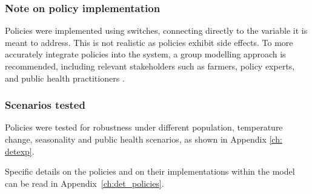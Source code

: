 \subsubsection*{Note on policy implementation}
Policies were implemented using switches, connecting directly to the variable it is meant to address. This is not realistic as policies exhibit side effects. To more accurately integrate policies into the system,  a group modelling approach is recommended, including relevant stakeholders such as farmers, policy experts, and public health practitioners \parencite{vennix_group_1999}. %

\subsubsection{Scenarios tested}
Policies were tested for robustness under different population, temperature change, seasonality and public health scenarios, as shown in Appendix \ref{ch: detexp}.


Specific details on the policies and on their implementations within the model can be read in Appendix~\ref{ch:det_policies}.
